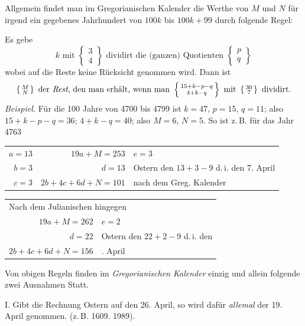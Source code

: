 Allgemein findet man im Gregorianischen Kalender die Werthe von $M$
und $N$ für irgend ein gegebenes Jahrhundert von $100k$ bis $100k+99$ durch
folgende Regel:

Es gebe
\[
k\text{ mit }\left\{\begin{smallmatrix}3\\4\end{smallmatrix}\right\}
\text{ dividirt die (ganzen) Quotienten }
\left\{\begin{smallmatrix}p\\q\end{smallmatrix}\right\}
\]
wobei auf die Reste keine Rücksicht genommen wird.
Dann ist
\[
\left\{\begin{smallmatrix}M\\N\end{smallmatrix}\right\}
\text{ der \textit{Rest}, den man erhält, wenn man }
\left\{\begin{smallmatrix}15+k-p-q\\4+k-q\end{smallmatrix}\right\}
\text{ mit }\left\{\begin{smallmatrix}30\\7\end{smallmatrix}\right\}\text{ dividirt.}
\]
\textit{Beispiel.} Für die 100 Jahre von 4700 bis 4799 ist $k=47$, $p=15$, $q=11$;
also $15+k-p-q=36$; $4+k-q=40$; also $M=6$, $N=5$. So ist z.\,B.
für das Jahr 4763
%
\begin{center}\small
\begin{tabular}{r|r|l}
$a=13$ & $19a+M=253$ & $e=3$\\
$b=3$ & $d=13$ & Ostern den $13+3-9$ d.\,i. den 7. April\\
$c=3$ & $2b+4c+6d+N=101$ & \quad nach dem Greg. Kalender
\end{tabular}\par\medskip
\begin{tabular}{r|l}
\multicolumn{2}{l}{Nach dem Julianischen hingegen}\\
$19a+M=262$ & $e=2$\\
$d=22$ & Ostern den $22+2-9$ d.\,i. den\\
$2b+4c+6d+N=156$ & \quad 15. April
\end{tabular}
\end{center}

Von obigen Regeln finden im \textit{Gregorianischen Kalender} einzig und allein
folgende zwei Ausnahmen Statt.

I. Gibt die Rechnung Ostern auf den 26. April, so wird dafür \textit{allemal} der
19. April genommen. (z.\,B. 1609. 1989).

